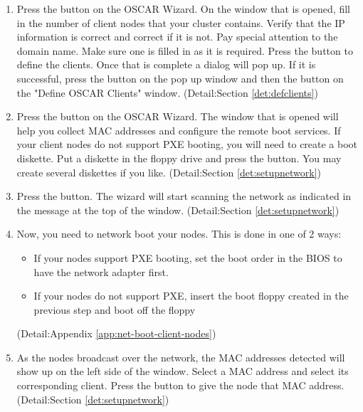 \begin {enumerate}
\item Press the  button on the OSCAR Wizard. 
On the window that is opened, fill in the number of client nodes that your cluster
contains. Verify that the IP information is correct and correct if it is not.
Pay special attention to the domain name. Make sure one is filled in as it is
required.
Press the  button to define the clients. Once that is 
complete a dialog will pop up. 
If it is successful, press the  button on the pop up window 
and then the  button on the "Define OSCAR Clients"
window. 
(Detail:Section \ref{det:defclients})

\item Press the  button on the OSCAR Wizard.
The window that is opened will help you collect MAC addresses and configure
the remote boot services. If your client nodes do not support PXE booting,
you will need to create a boot diskette. Put a diskette in the floppy
drive and press the  button. You may create 
several diskettes if you like.
(Detail:Section \ref{det:setupnetwork})

\item Press the  button. The wizard will start
scanning the network as indicated in the message at the top of the window. 
(Detail:Section \ref{det:setupnetwork})

\item Now, you need to network boot your nodes. This is done in one of 2 ways:

        \begin{itemize}
        \item If your nodes support PXE booting, set the boot order in the BIOS
        to have the network adapter first.
        \item If your nodes do not support PXE, insert the boot floppy created
        in the previous step and boot off the floppy
        \end{itemize}

(Detail:Appendix \ref{app:net-boot-client-nodes})

\item As the nodes broadcast over the network, the MAC addresses detected will show
up on the left side of the window. Select a MAC address and select its 
corresponding client. Press the  button to give the
node that MAC address. 
(Detail:Section \ref{det:setupnetwork})


\end{enumerate}
